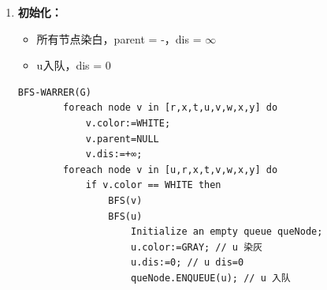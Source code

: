 \documentclass{article}
\begin{document}
\begin{enumerate}
    \item \textbf{初始化：}
    \begin{itemize}
        \item 所有节点染白，parent = -，dis = $\infty$
        \item u入队，dis = 0
    \end{itemize}

    \begin{lstlisting}[style=algorithmPPT]
        BFS-WARRER(G)
        foreach node v in [r,x,t,u,v,w,x,y] do
            v.color:=WHITE; 
            v.parent=NULL 
            v.dis:=+∞;
        foreach node v in [u,r,x,t,v,w,x,y] do
            if v.color == WHITE then
                BFS(v)
                BFS(u)
                    Initialize an empty queue queNode;
                    u.color:=GRAY; // u 染灰
                    u.dis:=0; // u dis=0
                    queNode.ENQUEUE(u); // u 入队
    \end{lstlisting}
\begin{figure}[htbp]
    \begin{minipage}[b]{0.6\textwidth}    %
            \centering
\end{minipage}
\end{figure}
\end{enumerate}
\end{document}
